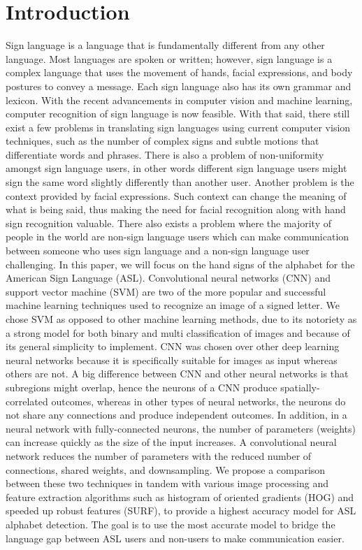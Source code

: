 \documentclass[conference]{IEEEtran}
\begin{document}
\section{Introduction}
Sign language is a language that is fundamentally different from any other language. Most languages are spoken or written; however, sign language is a complex language that uses the movement of hands, facial expressions, and body postures to convey a message. Each sign language also has its own grammar and lexicon. With the recent advancements in computer vision and machine learning, computer recognition of sign language is now feasible. With that said, there still exist a few problems in translating sign languages using current computer vision techniques, such as the number of complex signs and subtle motions that differentiate words and phrases. There is also a problem of non-uniformity amongst sign language users, in other words different sign language users might sign the same word slightly differently than another user. Another problem is the context provided by facial expressions. Such context can change the meaning of what is being said, thus making the need for facial recognition along with hand sign recognition valuable. There also exists a problem where the majority of people in the world are non-sign language users which can make communication between someone who uses sign language and a non-sign language user challenging. In this paper, we will focus on the hand signs of the alphabet for the American Sign Language (ASL). Convolutional neural networks (CNN) and support vector machine (SVM) are two of the more popular and successful machine learning techniques used to recognize an image of a signed letter. We chose SVM as opposed to other machine learning methods, due to its notoriety as a strong model for both binary and multi classification of images and because of its general simplicity to implement. CNN was chosen over other deep learning neural networks because it is specifically suitable for images as input whereas others are not. A big difference between CNN and other neural networks is that subregions might overlap, hence the neurons of a CNN produce spatially-correlated outcomes, whereas in other types of neural networks, the neurons do not share any connections and produce independent outcomes. In addition, in a neural network with fully-connected neurons, the number of parameters (weights) can increase quickly as the size of the input increases. A convolutional neural network reduces the number of parameters with the reduced number of connections, shared weights, and downsampling. We propose a comparison between these two techniques in tandem with various image processing and feature extraction algorithms such as histogram of oriented gradients (HOG) and speeded up robust features (SURF), to provide a highest accuracy model for ASL alphabet detection. The goal is to use the most accurate model to bridge the language gap between ASL users and non-users to make communication easier.
\end{document}
